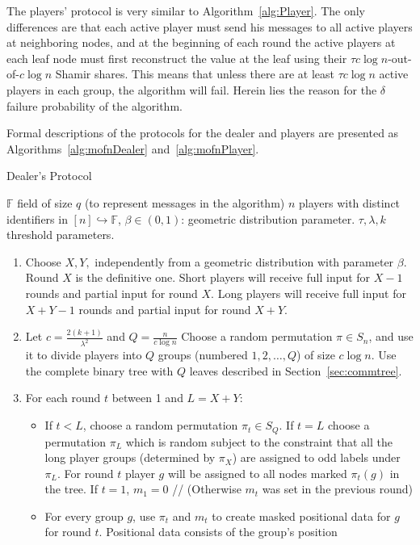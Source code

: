 \documentclass[12pt]{article}
\theoremstyle{definition}
\newcommand{\F}{\mathbb{F}}
\begin{document}
The players' protocol is very similar to Algorithm~\ref{alg:Player}. The only 
differences are that each active player must send his messages to all active 
players at neighboring nodes, and at the beginning of each round the active 
players at each leaf node must first reconstruct the value at the leaf using 
their $\tau c\log n$-out-of-$c\log n$ Shamir shares. This means that unless 
there are at least $\tau c\log n$ active players in each group, the algorithm 
will fail. Herein lies the reason for the $\delta$ failure probability of the 
algorithm.

Formal descriptions of the protocols for the dealer and players are presented 
as Algorithms~\ref{alg:mofnDealer} and~\ref{alg:mofnPlayer}.

\begin{algorithm}
{\small
\caption{Dealer's Protocol} \label{alg:mofnDealer} 
$\F$ field of size $q$ (to represent messages in the algorithm)
$n$ players with distinct identifiers in $[n] \hookrightarrow \F$,
$\beta \in (0, 1)$: geometric distribution parameter.
$\tau, \lambda, k$ threshold parameters.
\begin{enumerate}
\item Choose $X, Y,$ independently from a geometric distribution with 
parameter $\beta$. Round $X$ is the definitive one. Short players will receive 
full input for $X-1$ rounds and partial input for round $X$. Long players 
will receive full input for $X+Y-1$ rounds and partial input for round $X+Y$. 
\item Let $c =\frac{2(k+1)}{\lambda^2}$ and $Q= \frac{n}{c\log n}$
Choose a random permutation $\pi \in S_n$, and use it to divide players into 
$Q$ groups (numbered $1, 2, \dots, Q$) of size $c\log n$. Use the complete 
binary tree with $Q$ leaves described in Section~\ref{sec:commtree}.
\item For each round $t$ between 1 and $L=X+Y$:
\begin{itemize}
\item If $t<L$, choose a random permutation $\pi_t \in S_Q$. 
If $t=L$ choose a permutation $\pi_L$ which is random subject to the 
constraint that all the long player groups (determined by $\pi_X$) are assigned 
to odd labels under $\pi_L$. For round $t$ player $g$ will be assigned to 
all nodes marked $\pi_t(g)$ in the tree. If $t=1$, $m_1=0$ // (Otherwise 
$m_t$ was set in the previous round)
\item For every group $g$, use $\pi_t$ and $m_t$ to create masked positional 
data for $g$ for round $t$. Positional data consists of the group's position 

\end{itemize}
\end{enumerate}}
\end{algorithm}
\end{document}
